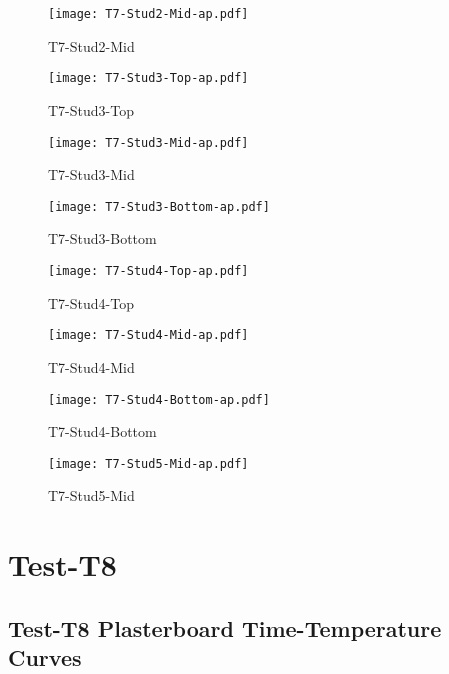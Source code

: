 \begin{figure}[htbp]
	\centering
			\texttt{[image: T7-Stud2-Mid-ap.pdf]}
			\caption*{T7-Stud2-Mid}
\end{figure}
\begin{figure}[htbp]
	\centering
			\texttt{[image: T7-Stud3-Top-ap.pdf]}
			\caption*{T7-Stud3-Top}
\end{figure}
\begin{figure}[htbp]
	\centering
			\texttt{[image: T7-Stud3-Mid-ap.pdf]}
			\caption*{T7-Stud3-Mid}
\end{figure}
\begin{figure}[htbp]
	\centering
			\texttt{[image: T7-Stud3-Bottom-ap.pdf]}
			\caption*{T7-Stud3-Bottom}
\end{figure}
\begin{figure}[htbp]
	\centering
			\texttt{[image: T7-Stud4-Top-ap.pdf]}
			\caption*{T7-Stud4-Top}
\end{figure}
\begin{figure}[htbp]
	\centering
			\texttt{[image: T7-Stud4-Mid-ap.pdf]}
			\caption*{T7-Stud4-Mid}
\end{figure}
\begin{figure}[htbp]
	\centering
			\texttt{[image: T7-Stud4-Bottom-ap.pdf]}
			\caption*{T7-Stud4-Bottom}
\end{figure}
\begin{figure}[htbp]
	\centering
			\texttt{[image: T7-Stud5-Mid-ap.pdf]}
			\caption*{T7-Stud5-Mid}
\end{figure}

\pagebreak

\section*{Test-T8}
\subsection*{Test-T8 Plasterboard Time-Temperature Curves}

